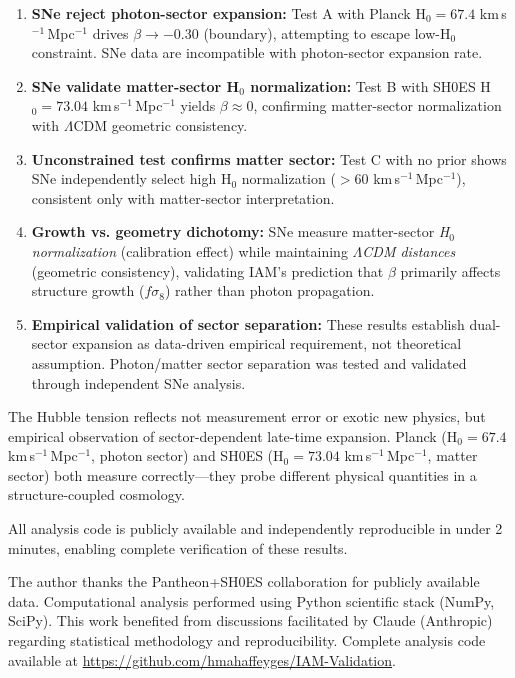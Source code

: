 \documentclass[twocolumn,superscriptaddress,prd,amsmath,amssymb]{revtex4-2}
\begin{document}
\begin{enumerate}
\item \textbf{SNe reject photon-sector expansion:} Test A with Planck H$_0 = 67.4$ km\,s$^{-1}$\,Mpc$^{-1}$ drives $\beta \to -0.30$ (boundary), attempting to escape low-H$_0$ constraint. SNe data are incompatible with photon-sector expansion rate.

\item \textbf{SNe validate matter-sector H$_0$ normalization:} Test B with SH0ES H$_0 = 73.04$ km\,s$^{-1}$\,Mpc$^{-1}$ yields $\beta \approx 0$, confirming matter-sector normalization with $\Lambda$CDM geometric consistency.

\item \textbf{Unconstrained test confirms matter sector:} Test C with no prior shows SNe independently select high H$_0$ normalization ($>60$ km\,s$^{-1}$\,Mpc$^{-1}$), consistent only with matter-sector interpretation.

\item \textbf{Growth vs. geometry dichotomy:} SNe measure matter-sector \textit{H$_0$ normalization} (calibration effect) while maintaining \textit{$\Lambda$CDM distances} (geometric consistency), validating IAM's prediction that $\beta$ primarily affects structure growth ($f\sigma_8$) rather than photon propagation.

\item \textbf{Empirical validation of sector separation:} These results establish dual-sector expansion as data-driven empirical requirement, not theoretical assumption. Photon/matter sector separation was tested and validated through independent SNe analysis.
\end{enumerate}

The Hubble tension reflects not measurement error or exotic new physics, but empirical observation of sector-dependent late-time expansion. Planck (H$_0 = 67.4$ km\,s$^{-1}$\,Mpc$^{-1}$, photon sector) and SH0ES (H$_0 = 73.04$ km\,s$^{-1}$\,Mpc$^{-1}$, matter sector) both measure correctly---they probe different physical quantities in a structure-coupled cosmology.

All analysis code is publicly available and independently reproducible in under 2 minutes, enabling complete verification of these results.

\begin{acknowledgments}
The author thanks the Pantheon+SH0ES collaboration for publicly available data. Computational analysis performed using Python scientific stack (NumPy, SciPy). This work benefited from discussions facilitated by Claude (Anthropic) regarding statistical methodology and reproducibility. Complete analysis code available at \url{https://github.com/hmahaffeyges/IAM-Validation}.
\end{acknowledgments}
\end{document}
